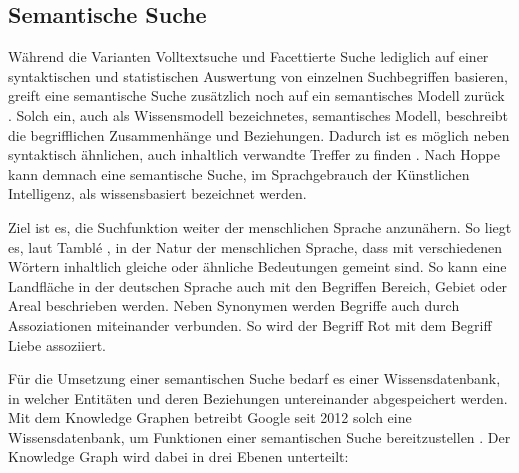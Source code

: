 \subsection{Semantische Suche\label{subsec2.1.4:Unterunterpunkt-4}}

Während die Varianten \glqq Volltextsuche\grqq{} und \glqq Facettierte Suche\grqq{} lediglich auf einer syntaktischen und statistischen Auswertung von einzelnen Suchbegriffen basieren, greift eine semantische Suche zusätzlich noch auf ein semantisches Modell zurück \cite[S. 4f]{Hoppe.2020}. Solch ein, auch als \glqq Wissensmodell\grqq{} bezeichnetes, semantisches Modell, beschreibt die begrifflichen Zusammenhänge und Beziehungen. Dadurch ist es möglich neben syntaktisch ähnlichen, auch inhaltlich verwandte Treffer zu finden \cite[S. 3]{Hoppe.2020}. Nach Hoppe \cite[S. 3]{Hoppe.2020} kann demnach eine semantische Suche, im Sprachgebrauch der Künstlichen Intelligenz, als wissensbasiert bezeichnet werden.

Ziel ist es, die Suchfunktion weiter der menschlichen Sprache anzunähern. So liegt es, laut Tamblé \cite{MelanieTamble.2012}, in der Natur der menschlichen Sprache, dass mit verschiedenen Wörtern inhaltlich gleiche oder ähnliche Bedeutungen gemeint sind. So kann eine Landfläche in der deutschen Sprache auch mit den Begriffen \glqq Bereich\grqq{}, \glqq Gebiet\grqq{} oder \glqq Areal\grqq{} beschrieben werden. Neben Synonymen werden Begriffe auch durch Assoziationen miteinander verbunden. So wird der Begriff \glqq Rot\grqq{} mit dem Begriff \glqq Liebe\grqq{} assoziiert.

Für die Umsetzung einer semantischen Suche bedarf es einer Wissensdatenbank, in welcher Entitäten und deren Beziehungen untereinander abgespeichert werden. Mit dem Knowledge Graphen betreibt Google seit 2012 solch eine Wissensdatenbank, um Funktionen einer semantischen Suche bereitzustellen \cite{OlafKopp.2021}. Der Knowledge Graph wird dabei in drei Ebenen unterteilt: \cite{OlafKopp.2021}

